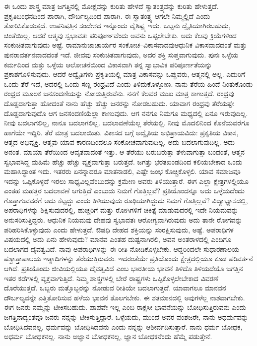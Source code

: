 ಈ ಒಂದು ಶಾಸ್ತ್ರ ಮಾತ್ರ ಜಗತ್ತಿನಲ್ಲಿ ಮೋಕ್ಷವನ್ನು ಕುರಿತು ಹೇಳದೆ ಸ್ವಾತಂತ್ರ್ಯವನ್ನು ಕುರಿತು ಹೇಳುತ್ತದೆ. ಪ್ರಕೃತಿಬಂಧನದಿಂದ ಪಾರಾಗಿ, ದೌರ್ಬಲ್ಯದಿಂದ ಪಾರಾಗಿ. ಈ ಸ್ವಾತಂತ್ರ್ಯ ಆಗಲೇ ನಿಮ್ಮಲ್ಲಿದೆ ಎಂದು ತೋರಿಸಿಕೊಡುತ್ತದೆ. ಉಪನಿಷತ್ತಿನ ಸಂದೇಶದ ಇನ್ನೊಂದು ವೈಶಿಷ್ಟ್ಯ ಇದು. ಒಬ್ಬನು ದ್ವೈತಿಯಾಗಿರಬಹುದು, ಚಿಂತೆಯಿಲ್ಲ. ಆದರೆ ಆತ್ಮವು ಸ್ವಭಾವತಃ ಪರಿಪೂರ್ಣವೆಂದು ಅವನು ಒಪ್ಪಲೇಬೇಕು. ಅದು ಕೆಲವು ಕ್ರಿಯೆಗಳಿಂದ ಸಂಕುಚಿತವಾಗುವುದು ಅಷ್ಟೆ. ರಾಮಾನುಜಾಚಾರ್ಯರ ಸಂಕೋಚ–ವಿಕಾಸವಾದವು\break ಆಧುನಿಕ ವಿಕಾಸವಾದದಂತೆ ಮತ್ತು ಪುನರಾವರ್ತನವಾದದಂತೆ  ಇದೆ. ಜೀವವು ಸಂಕುಚಿತವಾಗುವುದು, ಅದರ ಶಕ್ತಿ ಸುಪ್ತವಾಗುವುದು. ಪುನಃ ಒಳ್ಳೆಯ ಕರ್ಮದಿಂದ ಮತ್ತು ಒಳ್ಳೆಯ ಆಲೋಚನೆಯಿಂದ ವಿಕಾಸವಾಗಿ ತನ್ನ ಸ್ವಾಭಾವಿಕ ಪರಿಪೂರ್ಣತೆಯನ್ನು ಪ್ರಕಾಶಗೊಳಿಸುವುದು. ಆದರೆ ಅದ್ವೈತಿಗಳು ಪ್ರಕೃತಿಯಲ್ಲಿ ಮಾತ್ರ ವಿಕಾಸವನ್ನು ಒಪ್ಪುವರು, ಆತ್ಮನಲ್ಲಿ ಅಲ್ಲ. ಎದುರಿಗೆ ಒಂದು ತೆರೆ ಇದೆ, ಅದರಲ್ಲಿ ಒಂದು ಸಣ್ಣ ರಂಧ್ರವಿದೆ ಎಂದು ತಿಳಿದುಕೊಳ್ಳೋಣ. ನಾನು ತೆರೆಯ ಹಿಂದೆ ನಿಂತುಕೊಂಡು ರಂಧ್ರದ ಮೂಲಕ ಜನಸಂದಣಿಯನ್ನು ನೋಡುತ್ತಿರುವೆನು. ನನಗೆ ಕೆಲವರ ಮುಖ ಮಾತ್ರ ಕಾಣುತ್ತದೆ. ರಂಧ್ರವು ದೊಡ್ಡದಾಗುತ್ತಾ ಹೋದಂತೆ ನಾನು ಹೆಚ್ಚು ಹೆಚ್ಚು ಜನರನ್ನು ನೋಡಬಹುದು. ಯಾವಾಗ ರಂಧ್ರವು ತೆರೆಯಷ್ಟೇ ದೊಡ್ಡದಾಗುವುದೊ ಆಗ ಜನಸಂದಣಿಯೆಲ್ಲಾ ಕಾಣುವುದು. ಆಗ ನನಗೂ ನಿಮಗೂ ಮಧ್ಯದಲ್ಲಿ ಏನೂ ಇರುವುದಿಲ್ಲ. ನೀವು ಬದಲಾಗಲಿಲ್ಲ, ನಾನೂ ಬದ\-ಲಾಗಲಿಲ್ಲ. ಬದಲಾವಣೆಯೆಲ್ಲ ತೆರೆಯಲ್ಲಿ. ನೀವು ಮೊದಲಿನಿಂದ ಕೊನೆಯವರೆಗೂ ಹಾಗೆಯೇ ಇದ್ದಿರಿ. ತೆರೆ ಮಾತ್ರ ಬದಲಾಯಿತು. ವಿಕಾಸದ ಬಗ್ಗೆ ಅದ್ವೈತಿಯ ಅಭಿಪ್ರಾಯವಿದು: ಪ್ರಕೃತಿಯ ವಿಕಾಸ, ಆತ್ಮದ ಅಭಿವ್ಯಕ್ತಿ. ಆತ್ಮವು ಯಾವ ಕಾರಣದಿಂದಲೂ ಸಂಕೋಚವಾಗುವುದಿಲ್ಲ, ಅದು ಬದಲಾಗುವುದಿಲ್ಲ. ಅದು ಅನಂತ. ಮಾಯಾ ತೆರೆಯಿಂದ ಆವೃತವಾದಂತೆ ಇತ್ತು. ಆ ತೆರೆಯು ಬರುಬರುತ್ತಾ ತೆಳುವಾಗುತ್ತಾ ಬಂದಂತೆ, ಆತ್ಮನ ಸ್ವಭಾವಸಿದ್ಧ ಮಹಿಮೆ ಹೆಚ್ಚು ಹೆಚ್ಚು ವ್ಯಕ್ತವಾಗುತ್ತಾ ಬರುತ್ತದೆ. ಜಗತ್ತು ಭರತಖಂಡದಿಂದ ಕಲಿಯಬೇಕಾದ ಒಂದು ಮಹಾಸಿದ್ಧಾಂತ ಇದು. ಇತರರು ಏನನ್ನಾದರೂ ಮಾತನಾಡಲಿ, ಎಷ್ಟೇ ಜಂಭ ಕೊಚ್ಚಿಕೊಳ್ಳಲಿ. ಯಾವ ಸಮಾಜವೂ ಇದನ್ನು ಒಪ್ಪಿಕೊಳ್ಳದೆ ಇರಲು ಸಾಧ್ಯವಿಲ್ಲವೆಂಬುದನ್ನು ಕ್ರಮೇಣ ಅವರು ತಿಳಿಯುತ್ತಾರೆ. ಈಗ ಎಲ್ಲಾ ಕ್ಷೇತ್ರಗಳಲ್ಲಿಯೂ ಎಂತಹ ಮಹತ್ತರ ಬದಲಾವಣೆ ಆಗುತ್ತಿದೆ ಎಂಬುದು ನಿಮಗೆ ಗೊತ್ತಿಲ್ಲವೆ? ಪ್ರತಿಯೊಂದನ್ನೂ ಅದು ಒಳ್ಳೆಯದೆಂದು ಗೊತ್ತಾಗುವವರೆಗೆ ಅದು ಕೆಟ್ಟದ್ದು ಎಂದು ತಿಳಿಯುವುದು ರೂಢಿಯಾಗಿದ್ದುದು ನಿಮಗೆ ಗೊತ್ತಿಲ್ಲವೆ? ವಿದ್ಯಾಭ್ಯಾಸದಲ್ಲಿ, ಅಪರಾಧಿಗಳನ್ನು ಶಿಕ್ಷಿಸುವುದರಲ್ಲಿ, ಹುಚ್ಚರಿಗೆ ಮತ್ತು ರೋಗಿಗಳಿಗೆ ಚಿಕಿತ್ಸೆ ಮಾಡುವುದರಲ್ಲಿ ಇದೇ ನಿಯಮವನ್ನು ಅನುಸರಿಸುತ್ತಿದ್ದರು. ಆಧುನಿಕ ನಿಯಮವು ದೇಹವು ಸ್ವಭಾವತಃ ಆರೋಗ್ಯವಾಗಿರುವುದು ಅದು ತಾನೇ ರೋಗವನ್ನು ಪರಿಹರಿಸಿಕೊಳ್ಳುವುದು ಎಂದು ಹೇಳುತ್ತದೆ. ಔಷಧಿ ದೇಹದ ಶಕ್ತಿಯನ್ನು ಸಂರಕ್ಷಿಸುವುದು, ಅಷ್ಟೆ. ಅಪರಾಧಿಗಳ ವಿಷಯದಲ್ಲಿ ಅದು ಏನು ಹೇಳುವುದು? ಮಾನವ ಎಂತಹ ದುಷ್ಟನಾಗಿರಲಿ, ಅವನ ಅಂತರಾಳದಲ್ಲಿ ಎಂದಿಗೂ ಬದಲಾಗದ ದೈವತ್ವವಿದೆ. ನಾವು ಅಪರಾಧಿಗಳನ್ನು ಈ ರೀತಿ ನೋಡಿಕೊಳ್ಳಬೇಕು. ಆದ್ದರಿಂದಲೇ ಸುಧಾರಣಾಲಯ  ಪಶ್ಚಾತ್ತಾಪಾಲಯ  ಇತ್ಯಾದಿಗಳನ್ನು ತೆರೆಯುತ್ತಿರುವರು. ಇದರಂತೆಯೇ ಪ್ರತಿಯೊಂದು ಕ್ಷೇತ್ರದಲ್ಲಿಯೂ ಕೂಡ ಪರಿವರ್ತನೆ ಆಗಿದೆ. ಪ್ರತಿಯೊಂದು ಜೀವಿಯಲ್ಲಿಯೂ ದೈವತ್ವವಿದೆ ಎಂಬ ಭಾರತೀಯ ಭಾವನೆ ತಿಳಿದೊ ತಿಳಿಯದೆಯೊ ಜಗತ್ತಿನ ಇತರ ಕಡೆಗಳಲ್ಲಿ ವ್ಯಕ್ತವಾಗುತ್ತಿದೆ. ನಿಮ್ಮ ಶಾಸ್ತ್ರಗಳಲ್ಲಿ ಬೇರೆ ರಾಷ್ಟ್ರಗಳು ಒಪ್ಪಿಕೊಳ್ಳಲೇಬೇಕಾದ ವಿವರಣೆ ದೊರೆಯುತ್ತದೆ. ಒಬ್ಬರು ಮತ್ತೊಬ್ಬರನ್ನು ನೋಡುವ ರೀತಿಯೇ ಬದಲಾಗುತ್ತದೆ. ಯಾವಾಗಲೂ ಮಾನವನ ದೌರ್ಬಲ್ಯವನ್ನೇ ಎತ್ತಿತೋರಿಸುವ ಹಳೆಯ ಭಾವನೆ ತೊಲಗಬೇಕು. ಈ ಶತಮಾನದಲ್ಲಿ ಅವುಗಳೆಲ್ಲ ನಾಶವಾಗಬೇಕು. ಈಗ ಜನರು ನಮ್ಮನ್ನು ಟೀಕಿಸಬಹುದು. ಪಾಪವೇ ಇಲ್ಲ ಎಂಬ ರಾಕ್ಷಸೀ ಭಾವನೆಯನ್ನು ಬೋಧಿಸುತ್ತಿರುವನು ಎಂದು ಜಗತ್ತಿನಾದ್ಯಂತವೂ ಜನರು ನನ್ನನ್ನು ಟೀಕಿಸುತ್ತಿದ್ದಾರೆ. ಒಳ್ಳೆಯದು, ಮುಂದೆ ಅವರ ವಂಶಜರೇ, ನಾನು ಅಧರ್ಮವನ್ನು ಬೋಧಿಸಿದವನಲ್ಲ, ಧರ್ಮವನ್ನು ಬೋಧಿಸಿದವನು ಎಂದು ನನ್ನನ್ನು ಆಶೀರ್ವದಿಸುತ್ತಾರೆ. ನಾನು ಧರ್ಮ ಬೋಧಕ, ಅಧರ್ಮ ಬೋಧಕನಲ್ಲ. ನಾನು ಅಜ್ಞಾನ ಬೋಧಕನಲ್ಲ, ಜ್ಞಾನ ಬೋಧಕನೆಂದು ಹೆಮ್ಮೆ ಪಡುತ್ತೇನೆ.

